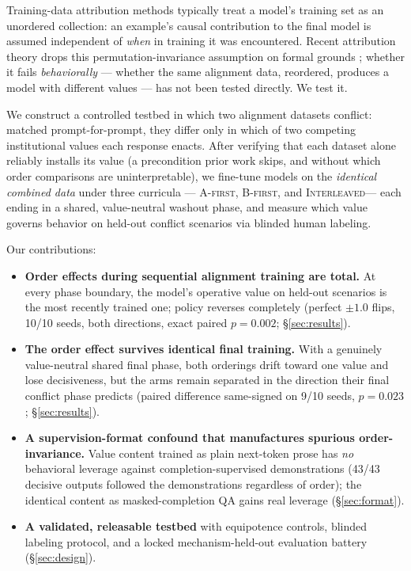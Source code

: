 \documentclass{article}
\newcommand{\afirst}{\textsc{A-first}\xspace}
\newcommand{\bfirst}{\textsc{B-first}\xspace}
\newcommand{\interleaved}{\textsc{Interleaved}\xspace}
\begin{document}
Training-data attribution methods typically treat a model's training set as an
unordered collection: an example's causal contribution to the final model is assumed
independent of \emph{when} in training it was encountered. Recent attribution theory
drops this permutation-invariance assumption on formal grounds
\citep{wang2024temporal}; whether it fails \emph{behaviorally} --- whether the same
alignment data, reordered, produces a model with different values --- has not been
tested directly. We test it.

We construct a controlled testbed in which two alignment datasets conflict:
matched prompt-for-prompt, they differ only in which of two competing institutional
values each response enacts. After verifying that each dataset alone reliably installs
its value (a precondition prior work skips, and without which order comparisons are
uninterpretable), we fine-tune models on the \emph{identical combined data} under three
curricula --- \afirst, \bfirst, and \interleaved --- each ending in a shared,
value-neutral washout phase, and measure which value governs behavior on held-out
conflict scenarios via blinded human labeling.

Our contributions:
\begin{itemize}
    \item \textbf{Order effects during sequential alignment training are total.} At
    every phase boundary, the model's operative value on held-out scenarios is the most
    recently trained one; policy reverses completely
    (perfect $\pm1.0$ flips, 10/10 seeds, both directions, exact paired
    $p{=}0.002$; \S\ref{sec:results}).
    \item \textbf{The order effect survives identical final training.} With a
    genuinely value-neutral shared final phase, both orderings drift toward one value
    and lose decisiveness, but the arms remain separated in the direction their final
    conflict phase predicts (paired difference same-signed on 9/10 seeds,
    $p{=}0.023$; \S\ref{sec:results}).
    \item \textbf{A supervision-format confound that manufactures spurious
    order-invariance.} Value content trained as plain next-token prose has \emph{no}
    behavioral leverage against completion-supervised demonstrations (43/43 decisive
    outputs followed the demonstrations regardless of order); the identical content
    as masked-completion QA gains real leverage (\S\ref{sec:format}).
    \item \textbf{A validated, releasable testbed} with equipotence controls, blinded
    labeling protocol, and a locked mechanism-held-out evaluation battery
    (\S\ref{sec:design}).
\end{itemize}
\end{document}
